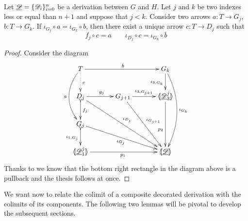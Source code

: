 \begin{corollary}\label{cor:ele}
	Let $\underline{\mathscr{D}}=\{\mathscr{D}_{i}\}_{i=0}^n$ be a derivation between $G$ and $H$. Let $j$ and $k$ be two indexes less or equal than $n+1$ and suppose that $j< k$.  Consider two arrows $a\colon T\to G_j$, $b\colon T\to G_k$. If $\iota_{G_j}\circ a = \iota_{G_k}\circ b$, 
	then  there exist a unique arrow $c\colon T\to D_j $  such that \[f_j\circ c = a\qquad \iota_{D_j}\circ c =\iota_{G_k}\circ b\]
	\end{corollary}
\begin{proof} Consider the diagram
			\[\xymatrix@C=34pt{T  \ar@/_.6cm/[dd]_{a}\ar@{.>}[d]^{c}\ar[rr]^{b}&& G_k \ar[d]_{\iota_{3, G_k}} \ar@/^.6cm/[ddd]^{\iota_{G_k}}\\D_{j} \ar[r]^{g_j} \ar[ddrr]^{\iota_{D_j}}\ar@{>->}[d]^{f_j}& G_{j+1} \ar[r]^-{\iota_{3,G_{j+1}}} \ar[ddr]^{\iota_{G_{j+1}}} & \lpro \der{D}^j_3\rpro \ar[dd]_(.6){p_2} \\ G_j \ar@{>->}[d]_{\iota_{1,G_j}} \ar[drr]_{\iota_{G_j}}\\ \lpro \der{D}^j_1 \rpro \ar[rr]_{p_1}  &&\tpro{D} }\] 
			Thanks to  we know that the bottom right rectangle in the diagram above is a pullback and the thesis follows at once.
\end{proof}	

We want now to relate the colimit of a composite decorated derivation with the colimits of its components. The following two lemmas will be pivotal to develop the subsequent sections.

